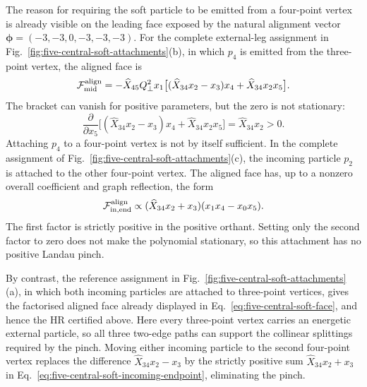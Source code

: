 \documentclass[a4paper,11pt]{article}
\begin{document}
The reason for requiring the soft particle to be emitted from a four-point
vertex is already visible on the leading face exposed by the natural alignment
vector \(\boldsymbol\phi=(-3,-3,0,-3,-3,-3)\).  For the complete external-leg
assignment in Fig.~\ref{fig:five-central-soft-attachments}(b), in which
\(p_4\) is emitted from the three-point vertex, the aligned face is
\begin{equation}
 \mathcal F_{\rm mid}^{\rm align}
 =-\widehat X_{45}Q_\perp^2x_1
 \big[(\widehat X_{34}x_2-x_3)x_4
       +\widehat X_{34}x_2x_5\big].
 \label{eq:five-central-soft-middle-attachment}
\end{equation}
The bracket can vanish for positive parameters, but the zero is not
stationary:
\begin{equation}
 \frac{\partial}{\partial x_5}
 \big[(\widehat X_{34}x_2-x_3)x_4
       +\widehat X_{34}x_2x_5\big]
 =\widehat X_{34}x_2>0.
 \label{eq:five-central-soft-middle-derivative}
\end{equation}
Attaching \(p_4\) to a four-point vertex is not by itself sufficient.  In the
complete assignment of Fig.~\ref{fig:five-central-soft-attachments}(c), the
incoming particle \(p_2\) is attached to the other four-point vertex.  The
aligned face has, up to a nonzero overall coefficient and graph reflection,
the form
\begin{equation}
 \mathcal F_{\rm in,end}^{\rm align}
 \propto
 (\widehat X_{34}x_2+x_3)(x_1x_4-x_0x_5).
 \label{eq:five-central-soft-incoming-endpoint}
\end{equation}
The first factor is strictly positive in the positive orthant.  Setting only
the second factor to zero does not make the polynomial stationary, so this
attachment has no positive Landau pinch.

By contrast, the reference assignment in
Fig.~\ref{fig:five-central-soft-attachments}(a), in which both incoming
particles are attached to three-point vertices, gives the factorised aligned
face already displayed in Eq.~\eqref{eq:five-central-soft-face}, and hence the
HR certified above.  Here every three-point vertex carries an energetic
external particle, so all three two-edge paths can support the collinear
splittings required by the pinch.  Moving either incoming particle to the
second four-point vertex replaces the difference
\(\widehat X_{34}x_2-x_3\) by the strictly positive sum
\(\widehat X_{34}x_2+x_3\) in
Eq.~\eqref{eq:five-central-soft-incoming-endpoint}, eliminating the pinch.
\end{document}
